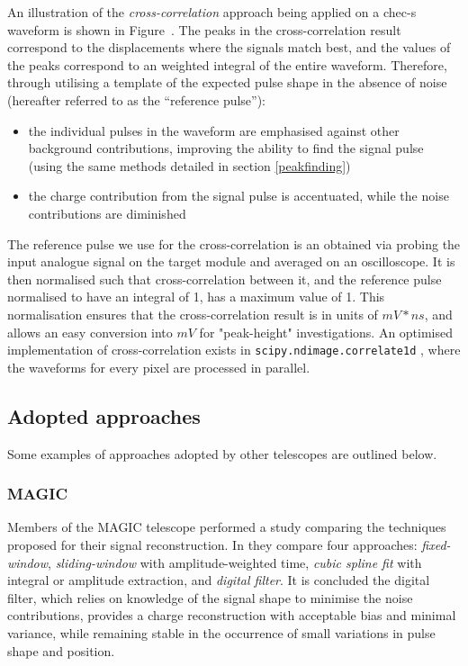 An illustration of the \textit{cross-correlation} approach being applied on a \gls{chec-s} waveform is shown in Figure~. The peaks in the cross-correlation result correspond to the displacements where the signals match best, and the values of the peaks correspond to an weighted integral of the entire waveform. Therefore, through utilising a template of the expected pulse shape in the absence of noise (hereafter referred to as the ``reference pulse''):
\begin{itemize}
	\item the individual pulses in the waveform are emphasised against other background contributions, improving the ability to find the signal pulse (using the same methods detailed in section \ref{peakfinding})
	\item the charge contribution from the signal pulse is accentuated, while the noise contributions are diminished
\end{itemize}
The reference pulse we use for the cross-correlation is an obtained via probing the input analogue signal on the \gls{target} module and averaged on an oscilloscope. It is then normalised such that cross-correlation between it, and the reference pulse normalised to have an integral of 1, has a maximum value of 1. This normalisation ensures that the cross-correlation result is in units of $mV*ns$, and allows an easy conversion into $mV$ for "peak-height" investigations.  An optimised implementation of cross-correlation exists in \lstinline{scipy.ndimage.correlate1d} \cite{scipy-crosscorrelate}, where the waveforms for every pixel are processed in parallel.

\subsection{Adopted approaches}

Some examples of approaches adopted by other telescopes are outlined below.

\subsubsection{MAGIC}

Members of the MAGIC telescope performed a study comparing the techniques proposed for their signal reconstruction. In \cite{Albert2008} they compare four approaches: \textit{fixed-window}, \textit{sliding-window} with amplitude-weighted time, \textit{cubic spline fit} with integral or amplitude extraction, and \textit{digital filter}. It is concluded the digital filter, which relies on knowledge of the signal shape to minimise the noise contributions, provides a charge reconstruction with acceptable bias and minimal variance, while remaining stable in the occurrence of small variations in pulse shape and position.

